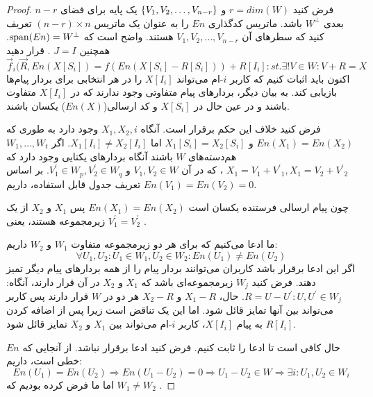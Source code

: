 \begin{proof}
    فرض کنید 
    $r = dim(W)$
     و 
     $\left\{ V_1, V_2, \ldots, V_{n - r}  \right\}$
     یک پایه برای فضای
      $n - r$
       بعدی 
      $W^\bot$
       باشد. ماتریس کدگذاری 
      $En$
       را به عنوان یک ماتریس 
     $(n - r) \times n $
      تعریف کنید که سطرهای آن 
      $V_1, V_2, \ldots, V_{n - r}$
       هستند. واضح است که 
      $\operatorname{span}(En) = W^\bot$.
       همچنین 
       $J = I$ 
       . قرار دهید
       $$\overrightarrow{f}_i(\overrightarrow{R}, En(X[S_i]) = f(En(X[S_i] - R[S_i])) + R[I_i]: st.\exists! V \in W: V + R = X $$
      اکنون باید اثبات کنیم که کاربر $i$-ام می‌تواند $X[I_i]$ را در هر انتخابی برای بردار پیام‌ها بازیابی کند. به بیان دیگر، بردارهای پیام متفاوتی وجود ندارند که در 
    $X[I_i]$‌
    متفاوت باشند و در عین حال در
    $X[S_i]$
      و کد ارسالی($En(X)$) یکسان باشند.
       
       فرض کنید خلاف این حکم برقرار است. آنگاه 
     $X_1, X_2, i$
      وجود دارد به طوری که 
     $En(X_1) = En(X_2)$
      و 
     $X_1[S_i] = X_2[S_i]$
      اما 
     $X_1[I_i] \neq X_2[I_i]$.
     اگر 
     $W_1, \ldots, W_t$
      هم‌دسته‌های 
     $W$
      باشند آنگاه بردارهای یکتایی وجود دارد که 
     $X_1 = V_1 + {V^\prime}_1, X_1 = V_2 + {V^\prime}_2$
     ، که در آن 
     $V_1, V_2 \in W$
      و 
      $V^\prime_1 \in W_p, V^\prime_2 \in W_q$.
    بر اساس تعریف جدول قابل استفاده، داریم
     $En(V_1) = En(V_2) = 0$.
    
    چون پیام ارسالی فرستنده یکسان است
    $En(X_1) = En(X_2)$
    پس
    $X_1$ و $X_2$
     از یک زیرمجموعه هستند، یعنی 
    $V^\prime_1 = V^\prime_2$
    .
    
    ما ادعا می‌کنیم که برای هر دو زیرمجموعه متفاوت 
    $W_1$ و $W_2$
     داریم: 
    $$\forall U_1, U_2: U_1 \in W_1, U_2 \in W_2: En(U_1) \neq En(U_2)$$
    اگر این ادعا برقرار باشد کاربران می‌توانند بردار پیام را از همه بردارهای پیام دیگر تمیز دهند. فرض کنید 
    $W_j$ 
    زیرمجموعه‌ای باشد که 
    $X_1$ و $X_2$
     در آن قرار دارند، آنگاه: 
     $R = U - U^\prime: U, U^\prime \in W_j$. 
     حال، 
     $X_1 - R$ و $X_2 - R$ 
     هر دو در 
     $W$
      قرار دارند پس کاربر می‌تواند بین آنها تمایز قائل شود. اما این یک تناقض است زیرا پس از اضافه کردن 
     $R[I_i]$
      به پیام 
     $X[I_i]$،
     کاربر 
     $i$-ام
      می‌تواند بین 
      $X_1$ و $X_2$ 
      تمایز قائل شود.
     
    حال کافی است تا ادعا را ثابت کنیم. فرض کنید ادعا برقرار نباشد. از آنجایی که $En$ خطی است، داریم: 
    $$En(U_1) = En(U_2) \Rightarrow En(U_1 - U_2) = 0 \Rightarrow U_1 - U_2 \in W \Rightarrow \exists i: U_1, U_2 \in W_i$$
    اما ما فرض کرده بودیم که
     $W_1 \neq W_2$
     .
\end{proof}

